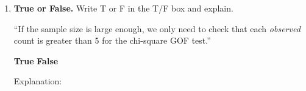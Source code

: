 \documentclass[10pt]{article}
\begin{document}
\begin{enumerate}
\begin{enumerate}[label=\alph*.]
          \boxguard[18]
          \item Check both conditions for a chi-square GOF test.
                \begin{itemize}
                    \item \textbf{Random:}
                    \boxguard[15]
                    \item \textbf{Large Counts:}
                \end{itemize}
        \end{enumerate}

  \item \textbf{True or False.} Write T or F in the T/F box and explain.

        ``If the sample size is large enough, we only need to check that each
        \emph{observed} count is greater than 5 for the chi-square GOF test.''

        \begin{center}
        \rule{0pt}{0.45in}\textbf{True} \qquad \textbf{False}
        \end{center}

        Explanation: 

\end{enumerate}
\end{document}
